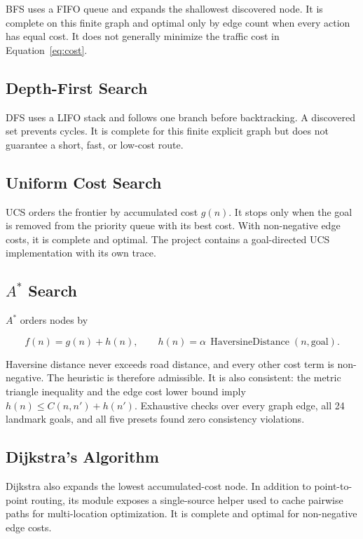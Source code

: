 \documentclass[12pt,a4paper]{article}
\begin{document}
BFS uses a FIFO queue and expands the shallowest discovered node. It is
complete on this finite graph and optimal only by edge count when every action
has equal cost. It does not generally minimize the traffic cost in
Equation~\ref{eq:cost}.

\subsection{Depth-First Search}

DFS uses a LIFO stack and follows one branch before backtracking. A discovered
set prevents cycles. It is complete for this finite explicit graph but does not
guarantee a short, fast, or low-cost route.

\subsection{Uniform Cost Search}

UCS orders the frontier by accumulated cost $g(n)$. It stops only when the goal
is removed from the priority queue with its best cost. With non-negative edge
costs, it is complete and optimal. The project contains a goal-directed UCS
implementation with its own trace.

\subsection{\texorpdfstring{$A^*$}{A-star} Search}

$A^*$ orders nodes by

\begin{equation}
    f(n)=g(n)+h(n), \qquad
    h(n)=\alpha\,\operatorname{HaversineDistance}(n,\text{goal}).
\end{equation}

Haversine distance never exceeds road distance, and every other cost term is
non-negative. The heuristic is therefore admissible. It is also consistent:
the metric triangle inequality and the edge cost lower bound imply
$h(n)\leq C(n,n')+h(n')$. Exhaustive checks over every graph edge, all 24
landmark goals, and all five presets found zero consistency violations.

\subsection{Dijkstra's Algorithm}

Dijkstra also expands the lowest accumulated-cost node. In addition to
point-to-point routing, its module exposes a single-source helper used to cache
pairwise paths for multi-location optimization. It is complete and optimal for
non-negative edge costs.
\end{document}
